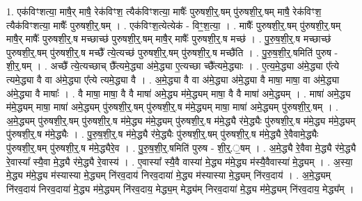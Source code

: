 \documentclass[17pt]{extarticle}
\begin{document}
1. एक॑विꣳशत्या॒ माषै॒र् माषै॒ रेक॑विꣳश॒ त्यैक॑विꣳशत्या॒ माषैः᳚ पुरुषशी॒र्॒.षम् पु॑रुषशी॒र्॒.षम् माषै॒ रेक॑विꣳश॒ त्यैक॑विꣳशत्या॒ माषैः᳚ पुरुषशी॒र्॒.षम् । . एक॑विꣳश॒त्येत्येक॑ - विꣳ॒॒श॒त्या॒ । . माषैः᳚ पुरुषशी॒र्॒.षम् पु॑रुषशी॒र्॒.षम् माषै॒र् माषैः᳚ पुरुषशी॒र्॒.ष मच्छाच्छ॑ पुरुषशी॒र्॒.षम् माषै॒र् माषैः᳚ पुरुषशी॒र्॒.ष मच्छ॑ । . पु॒रु॒ष॒शी॒र्॒.ष मच्छाच्छ॑ पुरुषशी॒र्॒.षम् पु॑रुषशी॒र्॒.ष मच्छै᳚ त्ये॒त्यच्छ॑ पुरुषशी॒र्॒.षम् पु॑रुषशी॒र्॒.ष मच्छै॑ति । . पु॒रु॒ष॒शी॒र्॒.षमिति॑ पुरुष - शी॒र्॒.षम् । . अच्छै᳚ त्ये॒त्यच्छाच् छै᳚त्यमे॒द्ध्या अ॑मे॒द्ध्या ए॒त्यच्छा च्छै᳚त्यमे॒द्ध्याः । . ए॒त्य॒मे॒द्ध्या अ॑मे॒द्ध्या ए᳚त्ये त्यमे॒द्ध्या वै वा अ॑मे॒द्ध्या ए᳚त्ये त्यमे॒द्ध्या वै । . अ॒मे॒द्ध्या वै वा अ॑मे॒द्ध्या अ॑मे॒द्ध्या वै माषा॒ माषा॒ वा अ॑मे॒द्ध्या अ॑मे॒द्ध्या वै माषाः᳚ । . वै माषा॒ माषा॒ वै वै माषा॑ अमे॒द्ध्य म॑मे॒द्ध्यम् माषा॒ वै वै माषा॑ अमे॒द्ध्यम् । . माषा॑ अमे॒द्ध्य म॑मे॒द्ध्यम् माषा॒ माषा॑ अमे॒द्ध्यम् पु॑रुषशी॒र्॒.षम् पु॑रुषशी॒र्॒.ष म॑मे॒द्ध्यम् माषा॒ माषा॑ अमे॒द्ध्यम् पु॑रुषशी॒र्॒.षम् । . अ॒मे॒द्ध्यम् पु॑रुषशी॒र्॒.षम् पु॑रुषशी॒र्॒.ष म॑मे॒द्ध्य म॑मे॒द्ध्यम् पु॑रुषशी॒र्॒.ष म॑मे॒द्ध्यै र॑मे॒द्ध्यैः पु॑रुषशी॒र्॒.ष म॑मे॒द्ध्य म॑मे॒द्ध्यम् पु॑रुषशी॒र्॒.ष म॑मे॒द्ध्यैः । . पु॒रु॒ष॒शी॒र्॒.ष म॑मे॒द्ध्यै र॑मे॒द्ध्यैः पु॑रुषशी॒र्॒.षम् पु॑रुषशी॒र्॒.ष म॑मे॒द्ध्यै रे॒वैवामे॒द्ध्यैः पु॑रुषशी॒र्॒.षम् पु॑रुषशी॒र्॒.ष म॑मे॒द्ध्यैरे॒व । . पु॒रु॒ष॒शी॒र्॒.षमिति॑ पुरुष - शी॒र्॒.॒षम् । . अ॒मे॒द्ध्यै रे॒वैवा मे॒द्ध्यै र॑मे॒द्ध्यै रे॒वास्या᳚ स्यै॒वा मे॒द्ध्यै र॑मे॒द्ध्यै रे॒वास्य॑ । . ए॒वास्या᳚ स्यै॒वै वास्या॑ मे॒द्ध्य म॑मे॒द्ध्य म॑स्यै॒वैवास्या॑ मे॒द्ध्यम् । . अ॒स्या॒ मे॒द्ध्य म॑मे॒द्ध्य म॑स्यास्या मे॒द्ध्यम् नि॑रव॒दाय॑ निरव॒दाया॑ मे॒द्ध्य म॑स्यास्या मे॒द्ध्यम् नि॑रव॒दाय॑ । . अ॒मे॒द्ध्यम् नि॑रव॒दाय॑ निरव॒दाया॑ मे॒द्ध्य म॑मे॒द्ध्यम् नि॑रव॒दाय॒ मेद्ध्य॒म् मेद्ध्य॑म् निरव॒दाया॑ मे॒द्ध्य म॑मे॒द्ध्यम् नि॑रव॒दाय॒ मेद्ध्य᳚म् । \newline
\end{document}
